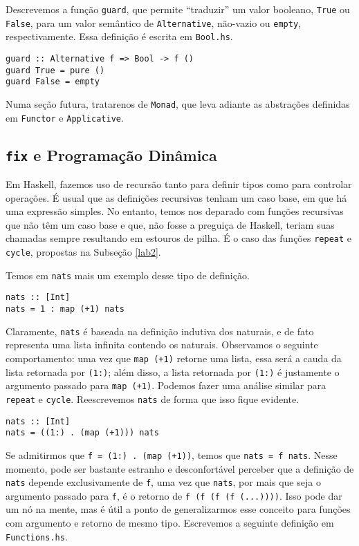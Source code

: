 \documentclass[a4paper]{article}
\begin{document}
Descrevemos a função \texttt{guard}, que permite ``traduzir'' um valor booleano, \texttt{True} ou \texttt{False}, para um valor semântico de \texttt{Alternative}, não-vazio ou \texttt{empty}, respectivamente.
Essa definição é escrita em \texttt{Bool.hs}.

\begin{verbatim}
guard :: Alternative f => Bool -> f ()
guard True = pure ()
guard False = empty
\end{verbatim}

Numa seção futura, tratarenos de \texttt{Monad}, que leva adiante as abstrações definidas em \texttt{Functor} e \texttt{Applicative}.

\subsection{\texttt{fix} e Programação Dinâmica}

Em Haskell, fazemos uso de recursão tanto para definir tipos como para controlar operações.
É usual que as definições recursivas tenham um caso base, em que há uma expressão simples.
No entanto, temos nos deparado com funções recursivas que não têm um caso base e que, não fosse a preguiça de Haskell, teriam suas chamadas sempre resultando em estouros de pilha.
É o caso das funções \texttt{repeat} e \texttt{cycle}, propostas na Subseção \ref{lab2}.

Temos em \texttt{nats} mais um exemplo desse tipo de definição.

\begin{verbatim}
nats :: [Int]
nats = 1 : map (+1) nats
\end{verbatim}

Claramente, \texttt{nats} é baseada na definição indutiva dos naturais, e de fato representa uma lista infinita contendo os naturais.
Observamos o seguinte comportamento:
uma vez que \mbox{\texttt{map (+1)}} retorne uma lista, essa será a cauda da lista retornada por \texttt{(1:)};
além disso, a lista retornada por \texttt{(1:)} é justamente o argumento passado para \texttt{map (+1)}.
Podemos fazer uma análise similar para \texttt{repeat} e \texttt{cycle}.
Reescrevemos \texttt{nats} de forma que isso fique evidente.

\begin{verbatim}
nats :: [Int]
nats = ((1:) . (map (+1))) nats
\end{verbatim}

Se admitirmos que \texttt{f = (1:) . (map (+1))}, temos que \texttt{nats = f nats}.
Nesse momento, pode ser bastante estranho e desconfortável perceber que a definição de \texttt{nats} depende exclusivamente de \texttt{f}, uma vez que \texttt{nats}, por mais que seja o argumento passado para \texttt{f}, é o retorno de \texttt{f (f (f (f (...))))}.
Isso pode dar um nó na mente, mas é útil a ponto de generalizarmos esse conceito para funções com argumento e retorno de mesmo tipo.
Escrevemos a seguinte definição em \texttt{Functions.hs}.
\end{document}

